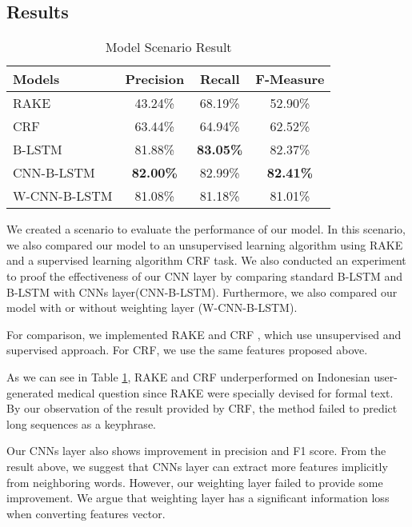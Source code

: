 \subsection{Results}
\begin{table}
	\caption{Model Scenario Result}
	\label{tab:model_scenario}
	\begin{tabular}{lccc}
		\toprule
		Models&Precision&Recall&F-Measure\\
		\midrule
		RAKE & 43.24\% & 68.19\% & 52.90\% \\
		
		CRF & 63.44\% & 64.94\% & 62.52\% \\
		
		B-LSTM & 81.88\% & \textbf{83.05\%} & 82.37\% \\
		
		CNN-B-LSTM & \textbf{82.00\%} & 82.99\% & \textbf{82.41\%} \\
		
		W-CNN-B-LSTM & 81.08\% & 81.18\% & 81.01\% \\
		\bottomrule
	\end{tabular}
\end{table}
We created a scenario to evaluate the performance of our model. In this scenario, we also compared our model to an unsupervised learning algorithm using RAKE \cite{rake} and a supervised learning algorithm CRF task. We also conducted an experiment to proof the effectiveness of our CNN layer by comparing standard B-LSTM and B-LSTM with CNNs layer(CNN-B-LSTM). Furthermore, we also compared our model with or without weighting layer (W-CNN-B-LSTM). 

For comparison, we implemented RAKE \cite{rake} and CRF \cite{zhang2008automatic}, which use unsupervised and supervised approach. For CRF, we use the same features proposed above.

As we can see in Table \ref{tab:model_scenario}, RAKE and CRF underperformed on Indonesian user-generated medical question since RAKE were specially devised for formal text. By our observation of the result provided by CRF, the method failed to predict long sequences as a keyphrase.

Our CNNs layer also shows improvement in precision and F1 score. From the result above, we suggest that CNNs layer can extract more features implicitly from neighboring words. However, our weighting layer failed to provide some improvement. We argue that weighting layer has a significant information loss when converting features vector.

